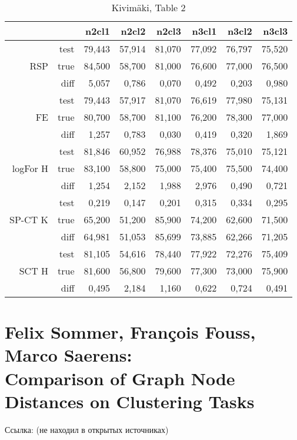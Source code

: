 \documentclass{article}
\begin{document}
\begin{table}[H]
\centering
\caption{Kivim{\"a}ki, Table 2}
\label{my-label}
\begin{tabular}{rr|rrrrrr}
         &      & n2cl1  & n2cl2  & n2cl3  & n3cl1  & n3cl2  & n3cl3 \\
         \hline
         & test & 79,443 & 57,914 & 81,070 & 77,092 & 76,797 & 75,520 \\
RSP      & true & 84,500 & 58,700 & 81,000 & 76,600 & 77,000 & 76,500 \\
         & diff & 5,057  & 0,786  & 0,070  & 0,492  & 0,203  & 0,980  \\
         \hline
         & test & 79,443 & 57,917 & 81,070 & 76,619 & 77,980 & 75,131 \\
FE       & true & 80,700 & 58,700 & 81,100 & 76,200 & 78,300 & 77,000 \\
         & diff & 1,257  & 0,783  & 0,030  & 0,419  & 0,320  & 1,869  \\
         \hline
         & test & 81,846 & 60,952 & 76,988 & 78,376 & 75,010 & 75,121 \\
logFor H & true & 83,100 & 58,800 & 75,000 & 75,400 & 75,500 & 74,400 \\
         & diff & 1,254  & 2,152  & 1,988  & 2,976  & 0,490  & 0,721  \\
         \hline
         & test & 0,219  & 0,147  & 0,201  & 0,315  & 0,334  & 0,295  \\
SP-CT K  & true & 65,200 & 51,200 & 85,900 & 74,200 & 62,600 & 71,500 \\
         & diff & \cellcolor{red!25} 64,981 & \cellcolor{red!25} 51,053 & \cellcolor{red!25} 85,699 &
                  \cellcolor{red!25} 73,885 & \cellcolor{red!25} 62,266 & \cellcolor{red!25} 71,205 \\
         \hline
         & test & 81,105 & 54,616 & 78,440 & 77,922 & 72,276 & 75,409 \\
SCT H    & true & 81,600 & 56,800 & 79,600 & 77,300 & 73,000 & 75,900 \\
         & diff & 0,495  & 2,184  & 1,160  & 0,622  & 0,724  & 0,491  
\end{tabular}
\end{table}


\section{Felix Sommer, Fran{\c c}ois Fouss, Marco Saerens:\\
         Comparison of Graph Node Distances on Clustering Tasks}
Ссылка: (не находил в открытых источниках)
\end{document}
